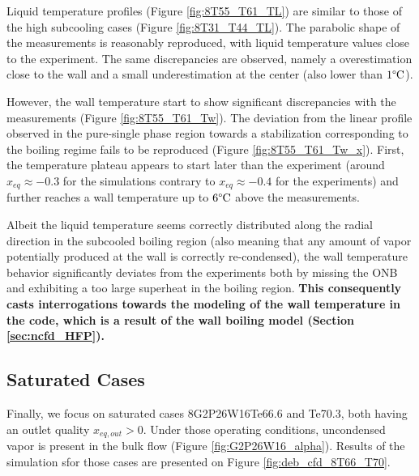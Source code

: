 \npar

Liquid temperature profiles (Figure \ref{fig:8T55_T61_TL}) are similar to those of the high subcooling cases (Figure \ref{fig:8T31_T44_TL}). The parabolic shape of the measurements is reasonably reproduced, with liquid temperature values close to the experiment. The same discrepancies are observed, namely a overestimation close to the wall and a small underestimation at the center (also lower than $1\degree\mathrm{C}$).

\npar

However, the wall temperature start to show significant discrepancies with the measurements (Figure \ref{fig:8T55_T61_Tw}). The deviation from the linear profile observed in the pure-single phase region towards a stabilization corresponding to the boiling regime fails to be reproduced (Figure \ref{fig:8T55_T61_Tw_x}). First, the temperature plateau appears to start later than the experiment (around $x_{eq}\approx -0.3$ for the simulations contrary to $x_{eq} \approx -0.4$ for the experiments) and further reaches a wall temperature up to $6 \degree\mathrm{C}$ above the measurements.

\npar
Albeit the liquid temperature seems correctly distributed along the radial direction in the subcooled boiling region (also meaning that any amount of vapor potentially produced at the wall is correctly re-condensed), the wall temperature behavior significantly deviates from the experiments both by missing the ONB and exhibiting a too large superheat in the boiling region. \textbf{This consequently casts interrogations towards the modeling of the wall temperature in the code, which is a result of the wall boiling model (Section \ref{sec:ncfd_HFP}).}



\subsection{Saturated Cases}

Finally, we focus on saturated cases 8G2P26W16Te66.6 and Te70.3, both having an outlet quality $x_{eq,out} > 0$. Under those operating conditions, uncondensed vapor is present in the bulk flow (Figure \ref{fig:G2P26W16_alpha}). Results of the simulation sfor those cases are presented on Figure \ref{fig:deb_cfd_8T66_T70}.



